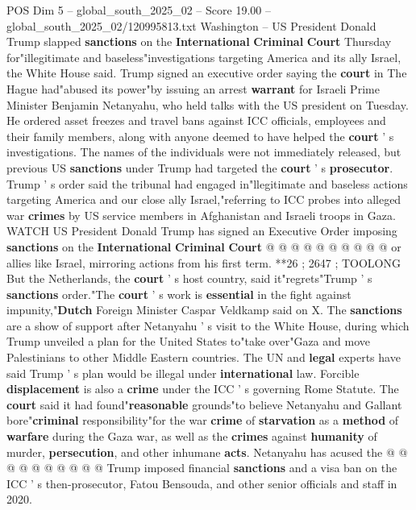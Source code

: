 \begin{textsample}{POS Dim 5 – global\_south\_2025\_02 – Score 19.00 – global\_south\_2025\_02/120995813.txt}  \label{ex:f5_pos_141}
Washington -- US President Donald Trump slapped \textbf{sanctions} on the \textbf{International} \textbf{Criminal} \textbf{Court} Thursday for"illegitimate and baseless"investigations targeting America and its ally Israel, the White House said.
Trump signed an executive order saying the \textbf{court} in The Hague had"abused its power"by issuing an arrest \textbf{warrant} for Israeli Prime Minister Benjamin Netanyahu, who held talks with the US president on Tuesday.
He ordered asset freezes and travel bans against ICC officials, employees and their family members, along with anyone deemed to have helped the \textbf{court} ' s investigations.
The names of the individuals were not immediately released, but previous US \textbf{sanctions} under Trump had targeted the \textbf{court} ' s \textbf{prosecutor}.
Trump ' s order said the tribunal had engaged in"llegitimate and baseless actions targeting America and our close ally Israel,"referring to ICC probes into alleged war \textbf{crimes} by US service members in Afghanistan and Israeli troops in Gaza.
WATCH US President Donald Trump has signed an Executive Order imposing \textbf{sanctions} on the \textbf{International} \textbf{Criminal} \textbf{Court} @ @ @ @ @ @ @ @ @ @ or allies like Israel, mirroring actions from his first term. **26 ; 2647 ; TOOLONG But the Netherlands, the \textbf{court} ' s host country, said it"regrets"Trump ' s \textbf{sanctions} order."The \textbf{court} ' s work is \textbf{essential} in the fight against impunity,"\textbf{Dutch} Foreign Minister Caspar Veldkamp said on X.
The \textbf{sanctions} are a show of support after Netanyahu ' s visit to the White House, during which Trump unveiled a plan for the United States to"take over"Gaza and move Palestinians to other Middle Eastern countries.
The UN and \textbf{legal} experts have said Trump ' s plan would be illegal under \textbf{international} law.
Forcible \textbf{displacement} is also a \textbf{crime} under the ICC ' s governing Rome Statute.
The \textbf{court} said it had found"\textbf{reasonable} grounds"to believe Netanyahu and Gallant bore"\textbf{criminal} responsibility"for the war \textbf{crime} of \textbf{starvation} as a \textbf{method} of \textbf{warfare} during the Gaza war, as well as the \textbf{crimes} against \textbf{humanity} of murder, \textbf{persecution}, and other inhumane \textbf{acts}.
Netanyahu has acused the @ @ @ @ @ @ @ @ @ @ Trump imposed financial \textbf{sanctions} and a visa ban on the ICC ' s then-prosecutor, Fatou Bensouda, and other senior officials and staff in 2020.

\end{textsample}
